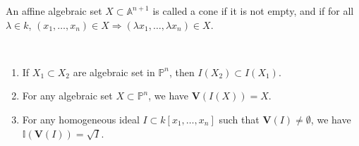                 \begin{definition}
                    An affine algebraic set $X\subset \mathbb{A}^{n+1}$
                    is called a cone if it is not empty, and if for all
                    $\lambda\in{k}$,
                    $(x_1,\hdots, x_n)%
                     \in{X}\Rightarrow(\lambda{x_{1}},\hdots,\lambda{x_{n}})%
                     \in{X}$.
                \end{definition}
                \begin{theorem}
                    \
                    \begin{enumerate}
                        \item If $X_1\subset X_2$ are algebraic
                              set in $\mathbb{P}^{n}$,
                              then $I(X_{2})\subset{I}(X_{1})$.
                        \item For any algebraic set
                              $X\subset\mathbb{P}^{n}$, we have
                              $\mathbf{V}(I(X))=X$.
                        \item For any homogeneous ideal
                              $I\subset{k}[x_{1},\hdots,x_{n}]$ such
                              that $\mathbf{V}(I)\ne\emptyset$,
                              we have
                              $\mathbb{I}(\mathbf{V}(I))=\sqrt{I}$.
                    \end{enumerate}
                \end{theorem}